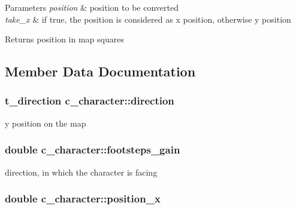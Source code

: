 \begin{DoxyParams}{Parameters}
{\em position} & position to be converted \\
\hline
{\em take\-\_\-x} & if true, the position is considered as x position, otherwise y position \\
\hline
\end{DoxyParams}
\begin{DoxyReturn}{Returns}
position in map squares 
\end{DoxyReturn}


\subsection{Member Data Documentation}
\hypertarget{classc__character_a571f1ae6115d7e9fee3159c41fcf27e8}{
\subsubsection[{direction}]{\setlength{\rightskip}{0pt plus 5cm}t\-\_\-direction c\-\_\-character\-::direction\hspace{0.3cm}{\ttfamily [protected]}}}\label{classc__character_a571f1ae6115d7e9fee3159c41fcf27e8}
y position on the map \hypertarget{classc__character_a4b50e02f88351baf6dc1542ef97fd413}{
\subsubsection[{footsteps\-\_\-gain}]{\setlength{\rightskip}{0pt plus 5cm}double c\-\_\-character\-::footsteps\-\_\-gain\hspace{0.3cm}{\ttfamily [protected]}}}\label{classc__character_a4b50e02f88351baf6dc1542ef97fd413}
direction, in which the character is facing \hypertarget{classc__character_a09bb0a2dd9eb4a0c7e791706fe51bddc}{
\subsubsection[{position\-\_\-x}]{\setlength{\rightskip}{0pt plus 5cm}double c\-\_\-character\-::position\-\_\-x\hspace{0.3cm}{\ttfamily [protected]}}}\label{classc__character_a09bb0a2dd9eb4a0c7e791706fe51bddc}
